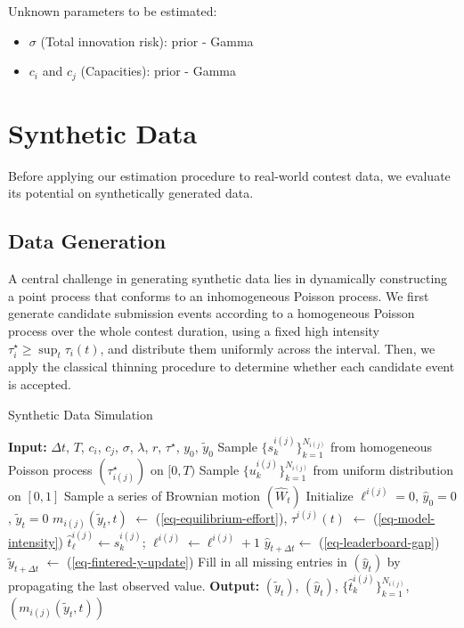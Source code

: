 \documentclass[mnsc]{informs3}
\begin{document}
Unknown parameters to be estimated: 
\begin{itemize}
	\item $\sigma$ (Total innovation risk): prior - Gamma
	\item $c_i$ and $c_j$ (Capacities): prior - Gamma
\end{itemize}



\section{Synthetic Data}

Before applying our estimation procedure to real-world contest data, we evaluate its potential on synthetically generated data.

\subsection{Data Generation}



A central challenge in generating synthetic data lies in dynamically constructing a point process that conforms to an inhomogeneous Poisson process.
We first generate candidate submission events according to a homogeneous Poisson process over the whole contest duration, using a fixed high intensity $\tau_i^\star \ge \sup_t \tau_i(t)$, and distribute them uniformly across the interval.
Then, we apply the classical thinning procedure \citep{lewis1979simulation} to determine whether each candidate event is accepted.

\begin{algorithm}
\caption{Synthetic Data Simulation}
\begin{algorithmic}
\STATE \textbf{Input:} 
	$\Delta t$, $T$, $c_i$, $c_j$, $\sigma$, $\lambda$, $r$, $\tau^\star$, $y_0$, $\tilde{y}_0$
\STATE Sample $\{s_k^{i(j)}\}^{N_{i(j)}}_{k=1}$ from homogeneous Poisson process $(\tau^\star_{i(j)})$ on $[0, T)$
\STATE Sample $\{u_k^{i(j)}\}^{N_{i(j)}}_{k=1}$ from uniform distribution on $[0, 1]$
\STATE Sample a series of Brownian motion $(\hat{W}_t)$
\STATE Initialize $\ell^{i(j)}=0$, $\hat{y}_0 = 0$, $\tilde{y}_t=0$
    \STATE $m_{i(j)}(\tilde{y}_t, t)$  $\gets$ (\ref{eq-equilibrium-effort}), $\tau^{i(j)}(t)$ $\gets$ (\ref{eq-model-intensity})
    \FOR{$s_{k}^{i(j)} \in [t, t+\Delta t)$} 
        	    \STATE $\hat{t}^{i(j)}_{\ell} \gets s_{k}^{i(j)}$; $\ell^{i(j)} \gets \ell^{i(j)}+1$
	    \hfill {}
	    \STATE $\hat{y}_{t+\Delta t} \gets $ (\ref{eq-leaderboard-gap})
        \ENDIF
    \ENDFOR
    \STATE $\tilde{y}_{t+\Delta t}$ $\gets$ (\ref{eq-fintered-y-update})
\ENDFOR
\STATE Fill in all missing entries in $(\hat{y}_t)$ by propagating the last observed value.
\STATE \textbf{Output:} $(\tilde{y}_t)$, $(\hat{y}_t)$, $\{\hat{t}_k^{i(j)}\}^{N_{i(j)}}_{k=1}$, $(m_{i(j)}(\tilde{y}_t, t))$
\end{algorithmic}
\end{algorithm}
\end{document}
